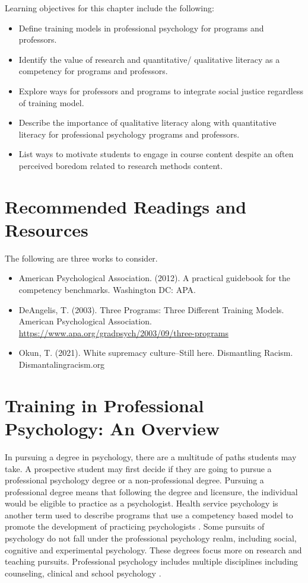 \documentclass[
  11pt,
]{book}
\providecommand{\tightlist}{%
  \setlength{\itemsep}{0pt}\setlength{\parskip}{0pt}}
\begin{document}
Learning objectives for this chapter include the following:

\begin{itemize}
\tightlist
\item
  Define training models in professional psychology for programs and professors.
\item
  Identify the value of research and quantitative/ qualitative literacy as a competency for programs and professors.
\item
  Explore ways for professors and programs to integrate social justice regardless of training model.
\item
  Describe the importance of qualitative literacy along with quantitative literacy for professional psychology programs and professors.
\item
  List ways to motivate students to engage in course content despite an often perceived boredom related to research methods content.
\end{itemize}

\section{Recommended Readings and Resources}\label{recommended-readings-and-resources}

The following are three works to consider.

\begin{itemize}
\tightlist
\item
  American Psychological Association. (2012). A practical guidebook for the competency benchmarks. Washington DC: APA.
\item
  DeAngelis, T. (2003). Three Programs: Three Different Training Models. American Psychological Association. \url{https://www.apa.org/gradpsych/2003/09/three-programs}
\item
  Okun, T. (2021). White supremacy culture--Still here. Dismantling Racism. Dismantalingracism.org
\end{itemize}

\section{Training in Professional Psychology: An Overview}\label{training-in-professional-psychology-an-overview}

In pursuing a degree in psychology, there are a multitude of paths students may take. A prospective student may first decide if they are going to pursue a professional psychology degree or a non-professional degree. Pursuing a professional degree means that following the degree and licensure, the individual would be eligible to practice as a psychologist. Health service psychology is another term used to describe programs that use a competency based model to promote the development of practicing psychologists \citep{noauthor_what_nodate}. Some pursuits of psychology do not fall under the professional psychology realm, including social, cognitive and experimental psychology. These degrees focus more on research and teaching pursuits. Professional psychology includes multiple disciplines including counseling, clinical and school psychology \citep{noauthor_types_nodate}.
\end{document}
